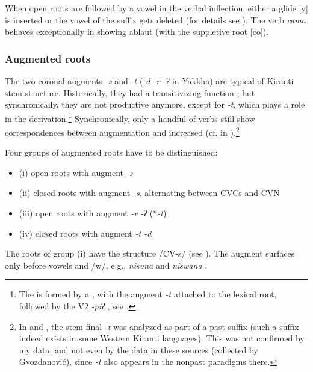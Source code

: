 When open roots are followed by a vowel in the verbal inflection, either a glide [y] is inserted or the vowel of the suffix gets deleted (for details see ). The verb \emph{cama} behaves exceptionally in showing ablaut (with the suppletive root [co]). 

\subsubsection{Augmented roots}

The two coronal augments \emph{-s} and \emph{-t} (\emph{\ti -d \ti -r \ti -ʔ} in Yakkha) are typical of Kiranti stem structure. Historically, they had a transitivizing function \citep{Sprigg1985The-Limbu, Michailovsky1985Tibeto-Burman, Driem1989_Reflexes, Matisoff2003Handbook, Bickel2003Belhare, Bickeletal2007Free}, but synchronically, they are not productive anymore, except for \emph{-t}, which plays a role in the  derivation.\footnote{The  is formed by a , with the augment \emph{-t}  attached to the lexical root, followed by the V2 \emph{-piʔ} , see .} Synchronically, only a handful of verbs still show correspondences between augmentation and increased  (cf.  in ).\footnote{In \citet{Driem1994The-Yakkha} and \citet{Gvozdanovic1987How}, the stem-final \emph{-t} was analyzed as part of a past suffix (such a suffix indeed exists in some Western Kiranti languages). This was not confirmed by my data, and not even by the data in these sources (collected by Gvozdanović), since \emph{-t} also appears in the nonpast paradigms there.} 

Four groups of augmented roots have to be distinguished: 

\begin{itemize}
\item (i) open roots with augment \emph{-s}
\item (ii) closed roots with augment \emph{-s}, alternating between CVCs and CVN
\item (iii)  open roots with augment \emph{-r \ti -ʔ} (*\emph{-t})
\item (iv) closed roots with  augment \emph{-t \ti -d}
\end{itemize}
 

The roots of  group (i) have the structure /CV-s/ (see ). The augment surfaces only before vowels and /w/, e.g., \emph{nisuna}  and \emph{niswana} . 

